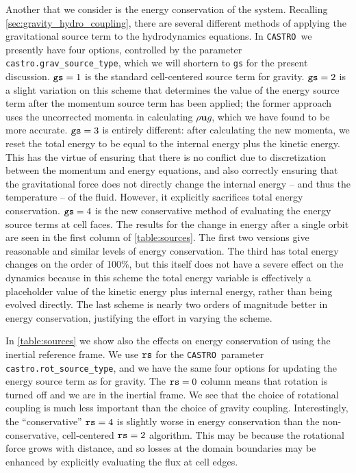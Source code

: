 \documentclass[iop]{../emulateapj}
\newcommand{\castro}{\texttt{CASTRO}}
\begin{document}
Another that we consider is the energy conservation of the system. Recalling \autoref{sec:gravity_hydro_coupling}, 
there are several different methods of applying the gravitational source term to the hydrodynamics equations. In \castro\ we presently 
have four options, controlled by the parameter {\tt castro.grav\_source\_type}, which we will shortern to {\tt gs} for the present 
discussion. ${\tt gs} = 1$ is the standard cell-centered source term for gravity. ${\tt gs} = 2$ is a slight variation on this scheme 
that determines the value of the energy source term after the momentum source term has been applied; the former approach uses 
the uncorrected momenta in calculating $\rho \mathbf{u} g$, which we have found to be more accurate. ${\tt gs} = 3$ is entirely 
different: after calculating the new momenta, we reset the total energy to be equal to the internal energy plus the 
kinetic energy. This has the virtue of ensuring that there is no conflict due to discretization between the momentum and 
energy equations, and also correctly ensuring that the gravitational force does not directly change the internal energy -- 
and thus the temperature -- of the fluid. However, it explicitly sacrifices total energy conservation. ${\tt gs} = 4$ is 
the new conservative method of evaluating the energy source terms at cell faces. The results for the change in energy 
after a single orbit are seen in the first column of \autoref{table:sources}. The first two versions give reasonable and 
similar levels of energy conservation. The third has total energy changes on the order of 100\%, but this itself 
does not have a severe effect on the dynamics because in this scheme the total energy variable is effectively a placeholder 
value of the kinetic energy plus internal energy, rather than being evolved directly. The last scheme is nearly two orders 
of magnitude better in energy conservation, justifying the effort in varying the scheme.

In \autoref{table:sources} we show also the effects on energy conservation of using the inertial reference frame. 
We use ${\tt rs}$ for the \castro\ parameter {\tt castro.rot\_source\_type}, and we have the same four options for updating
the energy source term as for gravity. The ${\tt rs} = 0$ column means that rotation is turned off and we are 
in the inertial frame. We see that the choice of rotational coupling is much less important than the choice of gravity coupling. 
Interestingly, the ``conservative'' ${\tt rs} = 4$ is slightly worse in energy conservation than the non-conservative, 
cell-centered ${\tt rs} = 2$ algorithm. This may be because the rotational force grows with distance, and so losses at the 
domain boundaries may be enhanced by explicitly evaluating the flux at cell edges.
\end{document}
